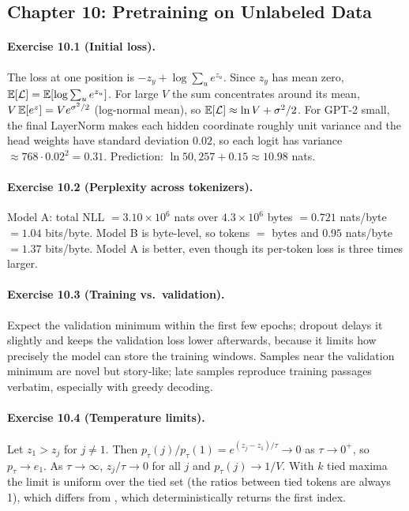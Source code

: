 \subsection*{Chapter 10: Pretraining on Unlabeled Data}

\paragraph{Exercise 10.1 (Initial loss).}
The loss at one position is $-z_y+\log\sum_u e^{z_u}$. Since $z_y$ has mean zero,
$\mathbb{E}[\mathcal L]=\mathbb{E}[\log\sum_u e^{z_u}]$. For large $V$ the sum concentrates around its mean,
$V\,\mathbb{E}[e^{z}]=V e^{\sigma^2/2}$ (log-normal mean), so $\mathbb{E}[\mathcal L]\approx\ln V+\sigma^2/2$.
For GPT-2 small, the final LayerNorm makes each hidden coordinate roughly unit variance and the
head weights have standard deviation $0.02$, so each logit has variance
$\approx768\cdot0.02^2=0.31$. Prediction: $\ln 50{,}257+0.15\approx10.98$ nats.

\paragraph{Exercise 10.2 (Perplexity across tokenizers).}
Model A: total NLL $=3.10\times10^6$ nats over $4.3\times10^6$ bytes $=0.721$ nats/byte $=1.04$
bits/byte. Model B is byte-level, so tokens $=$ bytes and $0.95$ nats/byte $=1.37$ bits/byte.
Model A is better, even though its per-token loss is three times larger.

\paragraph{Exercise 10.3 (Training vs.\ validation).}
Expect the validation minimum within the first few epochs; dropout delays it slightly and
keeps the validation loss lower afterwards, because it limits how precisely the model can store
the training windows. Samples near the validation minimum are novel but story-like; late samples
reproduce training passages verbatim, especially with greedy decoding.

\paragraph{Exercise 10.4 (Temperature limits).}
Let $z_1>z_j$ for $j\neq1$. Then $p_\tau(j)/p_\tau(1)=e^{(z_j-z_1)/\tau}\to0$ as $\tau\to0^+$,
so $p_\tau\to e_1$. As $\tau\to\infty$, $z_j/\tau\to0$ for all $j$ and $p_\tau(j)\to1/V$. With
$k$ tied maxima the limit is uniform over the tied set (the ratios between tied tokens are always
1), which differs from , which deterministically returns the first index.

